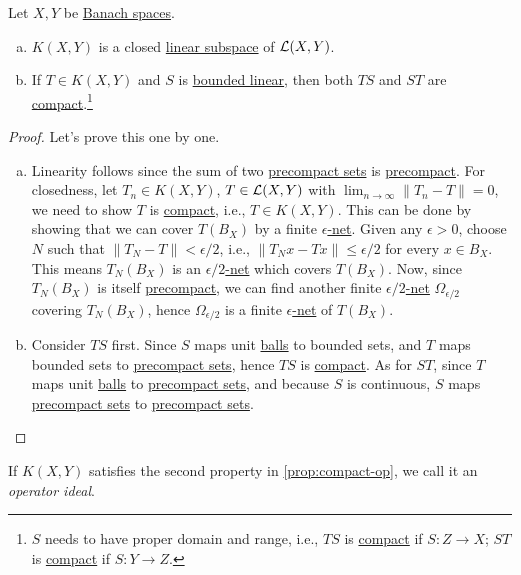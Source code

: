 \begin{proposition}[Peroperties of \(K(X, Y)\)]\label{prop:compact-op}
	Let \(X, Y\) be \hyperref[def:Banach-space]{Banach spaces}.
	\begin{enumerate}[(a)]
		\item \(K(X, Y)\) is a closed \hyperref[def:linear-vector-space]{linear subspace} of \(\mathcal{\MakeUppercase{l}} (X, Y)\).
		\item If \(T\in K(X, Y)\) and \(S\) is \hyperref[def:bounded-linear-op]{bounded linear}, then both \(TS\) and \(ST\) are \hyperref[def:compact-op]{compact}.\footnote{\(S\) needs to have proper domain and range, i.e., \(TS\) is \hyperref[def:compact-op]{compact} if \(S\colon Z\to X\); \(ST\) is \hyperref[def:compact-op]{compact} if \(S\colon Y\to Z\).}
	\end{enumerate}
\end{proposition}
\begin{proof}
	Let's prove this one by one.
	\begin{enumerate}[(a)]
		\item Linearity follows since the sum of two \hyperref[def:precompact]{precompact sets} is \hyperref[def:precompact]{precompact}. For closedness, let \(T_n\in K(X, Y)\), \(T\in \mathcal{\MakeUppercase{l}} (X, Y)\) with \(\lim_{n \to \infty} \left\lVert T_n - T\right\rVert = 0\), we need to show \(T\) is \hyperref[def:compact-op]{compact}, i.e., \(T\in K(X, Y)\). This can be done by showing that we can cover \(T(B_X)\) by a finite \hyperref[def:eps-net]{\(\epsilon \)-net}. Given any \(\epsilon >0\), choose \(N\) such that \(\left\lVert T_N - T\right\rVert < \epsilon / 2\), i.e., \(\lVert T_N x - Tx \rVert \leq \epsilon / 2\) for every \(x\in B_X\). This means \(T_N(B_X)\) is an \hyperref[def:eps-net]{\(\epsilon /2\)-net} which covers \(T(B_X)\). Now, since \(T_N (B_X)\) is itself \hyperref[def:precompact]{precompact}, we can find another finite \hyperref[def:eps-net]{\(\epsilon / 2\)-net} \(\Omega _{\epsilon /2}\) covering \(T_N(B_X)\), hence \(\Omega _{\epsilon / 2}\) is a finite \hyperref[def:eps-net]{\(\epsilon \)-net} of \(T(B_X)\).
		\item Consider \(TS\) first. Since \(S\) maps unit \hyperref[def:ball]{balls} to bounded sets, and \(T\) maps bounded sets to \hyperref[def:precompact]{precompact sets}, hence \(TS\) is \hyperref[def:compact-op]{compact}. As for \(ST\), since \(T\) maps unit \hyperref[def:ball]{balls} to \hyperref[def:precompact]{precompact sets}, and because \(S\) is continuous, \(S\) maps \hyperref[def:precompact]{precompact sets} to \hyperref[def:precompact]{precompact sets}.
	\end{enumerate}
\end{proof}

\begin{remark}
	If \(K(X, Y)\) satisfies the second property in \autoref{prop:compact-op}, we call it an \emph{operator ideal}.
\end{remark}